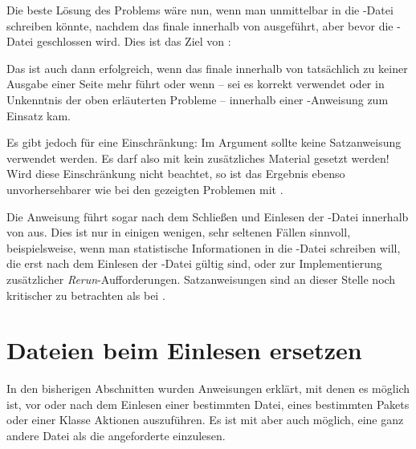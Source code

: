 Die beste Lösung des Problems wäre nun, wenn man unmittelbar in die
-Datei schreiben könnte, nachdem das finale
 innerhalb von 
ausgeführt, aber bevor die -Datei geschlossen wird. Dies ist das
Ziel von :
\begin{lstcode}
  \BeforeClosingMainAux{%
    \if@filesw
      \immediate\write\@auxout{%
        \protect\writethistoaux%
      }%
    \fi
  }
\end{lstcode}
Das ist auch dann erfolgreich, wenn das finale 
innerhalb von  tatsächlich zu keiner Ausgabe
einer Seite mehr führt oder wenn -- sei es korrekt verwendet oder in
Unkenntnis der oben erläuterten Probleme -- 
innerhalb einer -Anweisung zum Einsatz kam.

Es gibt jedoch für  eine Einschränkung: Im
Argument  sollte keine Satzanweisung verwendet
werden. Es darf also mit  kein zusätzliches
Material gesetzt werden! Wird diese Einschränkung nicht beachtet, so ist das
Ergebnis ebenso unvorhersehbarer wie bei den gezeigten Problemen mit
.

Die Anweisung 
führt sogar  nach dem Schließen und Einlesen der
-Datei innerhalb von  aus. Dies ist
nur in einigen wenigen, sehr seltenen Fällen sinnvoll, beispielsweise, wenn
man statistische Informationen in die -Datei schreiben will, die
erst nach dem Einlesen der -Datei gültig sind, oder zur
Implementierung zusätzlicher \emph{Rerun}-Aufforderungen. Satzanweisungen sind
an dieser Stelle noch kritischer zu betrachten als bei
.%
%
\EndIndexGroup


\section{Dateien beim Einlesen ersetzen}

In den bisherigen Abschnitten wurden Anweisungen erklärt, mit denen es möglich
ist, vor oder nach dem Einlesen einer bestimmten Datei, eines bestimmten
Pakets oder einer Klasse Aktionen auszuführen. Es ist mit 
aber auch möglich, eine ganz andere Datei als die angeforderte einzulesen.

